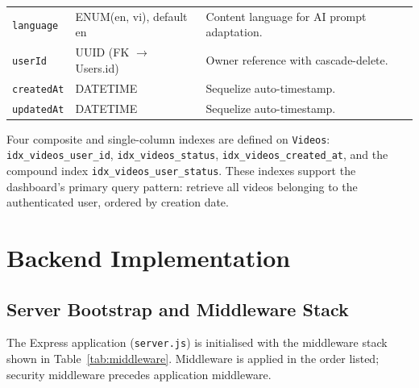 \begin{table}[H]
\begin{tabularx}{\linewidth}{llX}
    \texttt{language}       & ENUM(en, vi), default en          & Content language for AI prompt adaptation. \\
    \texttt{userId}         & UUID (FK $\to$ Users.id)          & Owner reference with cascade-delete. \\
    \texttt{createdAt}      & DATETIME                          & Sequelize auto-timestamp. \\
    \texttt{updatedAt}      & DATETIME                          & Sequelize auto-timestamp. \\
    \bottomrule
  \end{tabularx}
\end{table}

Four composite and single-column indexes are defined on \texttt{Videos}:
\texttt{idx\_videos\_user\_id}, \texttt{idx\_videos\_status},
\texttt{idx\_videos\_created\_at}, and the compound index
\texttt{idx\_videos\_user\_status}. These indexes support the dashboard's
primary query pattern: retrieve all videos belonging to the authenticated
user, ordered by creation date.

\section{Backend Implementation}

\subsection{Server Bootstrap and Middleware Stack}

The Express application (\texttt{server.js}) is initialised with the
middleware stack shown in Table~\ref{tab:middleware}. Middleware is applied
in the order listed; security middleware precedes application middleware.

